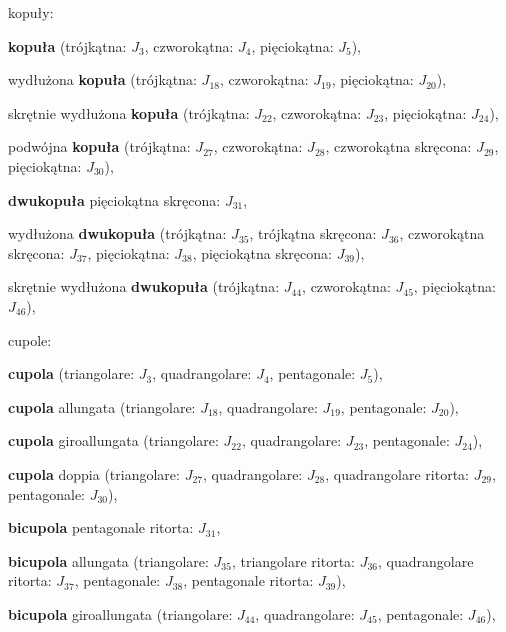 \begin{compactitem}
\begin{compactitem}
    \item kopuły: \begin{compactitem} %
        \item \textbf{kopuła} (trójkątna: $J_3$, czworokątna: $J_4$, pięciokątna: $J_5$), %
        \item wydłużona \textbf{kopuła} (trójkątna: $J_{18}$, czworokątna: $J_{19}$, pięciokątna: $J_{20}$), %
        \item skrętnie wydłużona \textbf{kopuła} (trójkątna: $J_{22}$, czworokątna: $J_{23}$, pięciokątna: $J_{24}$), %
        \item podwójna \textbf{kopuła} (trójkątna: $J_{27}$, czworokątna: $J_{28}$, czworokątna skręcona: $J_{29}$,\\ %
        pięciokątna: $J_{30}$), %
        \item \textbf{dwukopuła} pięciokątna skręcona: $J_{31}$, %
        \item wydłużona \textbf{dwukopuła} (trójkątna: $J_{35}$, trójkątna skręcona: $J_{36}$, czworokątna skręcona: $J_{37}$, pięciokątna: $J_{38}$, pięciokątna skręcona: $J_{39}$), %
        \item skrętnie wydłużona \textbf{dwukopuła} (trójkątna: $J_{44}$, czworokątna: $J_{45}$, pięciokątna: $J_{46}$), %
    \item cupole: \begin{compactitem} %
        \item \textbf{cupola} (triangolare: $J_3$, quadrangolare: $J_4$, pentagonale: $J_5$), %
        \item \textbf{cupola} allungata (triangolare: $J_{18}$, quadrangolare: $J_{19}$, pentagonale: $J_{20}$), %
        \item \textbf{cupola} giroallungata (triangolare: $J_{22}$, quadrangolare: $J_{23}$, pentagonale: $J_{24}$), %
        \item \textbf{cupola} doppia (triangolare: $J_{27}$, quadrangolare: $J_{28}$, quadrangolare ritorta: $J_{29}$,\\ %
        pentagonale: $J_{30}$), %
        \item \textbf{bicupola} pentagonale ritorta: $J_{31}$, %
        \item \textbf{bicupola} allungata (triangolare: $J_{35}$, triangolare ritorta: $J_{36}$, quadrangolare ritorta: $J_{37}$, pentagonale: $J_{38}$, pentagonale ritorta: $J_{39}$), %
        \item \textbf{bicupola} giroallungata (triangolare: $J_{44}$, quadrangolare: $J_{45}$, pentagonale: $J_{46}$), %
    \end{compactitem}


\end{compactitem}
\end{compactitem}
\end{compactitem}
